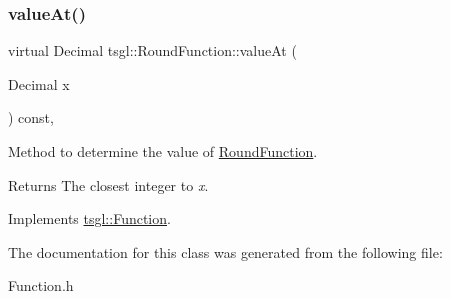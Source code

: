 \subsubsection{\texorpdfstring{value\+At()}{valueAt()}}
{\footnotesize\ttfamily virtual Decimal tsgl\+::\+Round\+Function\+::value\+At (\begin{DoxyParamCaption}\item[{Decimal}]{x }\end{DoxyParamCaption}) const\hspace{0.3cm}{\ttfamily [inline]}, {\ttfamily [virtual]}}



Method to determine the value of \hyperlink{classtsgl_1_1_round_function}{Round\+Function}. 

\begin{DoxyReturn}{Returns}
The closest integer to {\itshape x}. 
\end{DoxyReturn}


Implements \hyperlink{classtsgl_1_1_function_affb7b3b19a04efefa29a9870d666e912}{tsgl\+::\+Function}.



The documentation for this class was generated from the following file\+:\begin{DoxyCompactItemize}
\item 
Function.\+h\end{DoxyCompactItemize}
